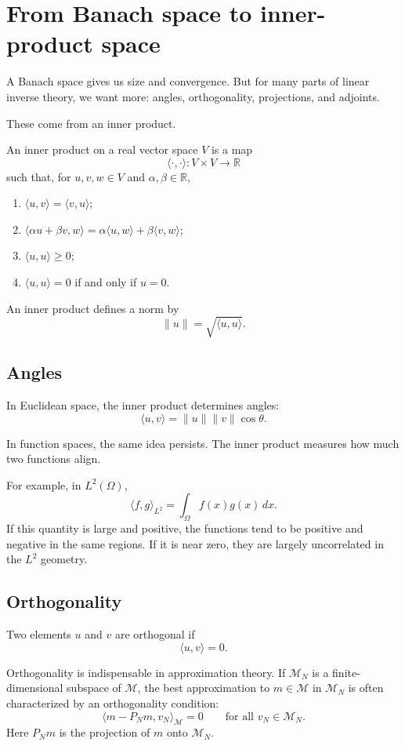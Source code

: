 \documentclass[11pt,a4paper]{book}
\newcommand{\M}{\mathcal{M}}      %
\newcommand{\R}{\mathbb{R}}
\begin{document}
\section{From Banach space to inner-product space}

A Banach space gives us size and convergence. But for many parts of linear
inverse theory, we want more: angles, orthogonality, projections, and adjoints.

These come from an inner product.

An inner product on a real vector space $V$ is a map
\[
    \langle \cdot,\cdot\rangle:V\times V\to\R
\]
such that, for $u,v,w\in V$ and $\alpha,\beta\in\R$,
\begin{enumerate}[label=\arabic*.]
    \item $\langle u,v\rangle=\langle v,u\rangle$;
    \item $\langle \alpha u+\beta v,w\rangle
    =
    \alpha\langle u,w\rangle+\beta\langle v,w\rangle$;
    \item $\langle u,u\rangle\geq 0$;
    \item $\langle u,u\rangle=0$ if and only if $u=0$.
\end{enumerate}

An inner product defines a norm by
\[
    \|u\|
    =
    \sqrt{\langle u,u\rangle}.
\]

\subsection{Angles}

In Euclidean space, the inner product determines angles:
\[
    \langle u,v\rangle
    =
    \|u\|\|v\|\cos\theta.
\]

In function spaces, the same idea persists. The inner product measures how much
two functions align.

For example, in $L^2(\Omega)$,
\[
    \langle f,g\rangle_{L^2}
    =
    \int_\Omega f(x)g(x)\,dx.
\]
If this quantity is large and positive, the functions tend to be positive and
negative in the same regions. If it is near zero, they are largely uncorrelated
in the $L^2$ geometry.

\subsection{Orthogonality}

Two elements $u$ and $v$ are orthogonal if
\[
    \langle u,v\rangle = 0.
\]

Orthogonality is indispensable in approximation theory. If $\M_N$ is a
finite-dimensional subspace of $\M$, the best approximation to $m\in\M$ in
$\M_N$ is often characterized by an orthogonality condition:
\[
    \langle m-P_Nm,v_N\rangle_{\M}=0
    \qquad
    \text{for all } v_N\in\M_N.
\]
Here $P_Nm$ is the projection of $m$ onto $\M_N$.
\end{document}
